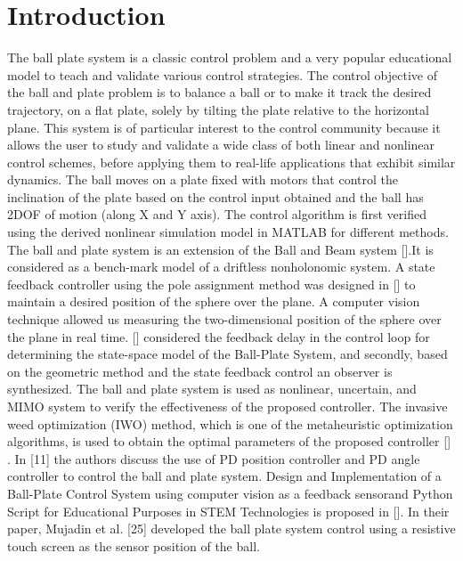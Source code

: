 \documentclass[conference]{IEEEtran}
\begin{document}
\section{Introduction}
The ball plate system is a classic control problem and a very popular educational model to teach and validate various control strategies. The control objective of the ball and plate problem is to balance a ball or to make it track the desired trajectory, on a flat plate, solely by tilting the plate relative to the horizontal plane. This system is of particular interest to the control community because it allows the user to study and validate a wide class of both linear and nonlinear control schemes, before applying them to real-life applications that exhibit similar dynamics. The ball moves on a plate fixed with motors that control the inclination of the plate based on the control input obtained and the ball has 2DOF of motion (along X and Y axis).   The control algorithm is first verified using the derived nonlinear simulation model in MATLAB for different methods.
The ball and plate system is an extension of the Ball and Beam system [].It is considered as a bench-mark model of a driftless nonholonomic system. A state feedback controller using the pole assignment method was designed in [] to maintain a desired position of the sphere over the plane. A computer vision technique allowed us measuring the two-dimensional position of the sphere over the plane in real time.  [] considered the feedback delay in the control loop for determining the state-space model of the Ball-Plate System, and secondly, based on the geometric method and the state feedback control an observer is synthesized. The ball and plate system is used as nonlinear, uncertain, and MIMO system to verify the effectiveness of the proposed controller.  The invasive weed optimization (IWO) method, which is one of the metaheuristic optimization algorithms, is used to obtain the optimal parameters of the proposed controller [] . In [11] the authors discuss the use of PD position controller and PD angle controller to control the ball and plate system. Design and Implementation of a Ball-Plate Control System using computer vision as a feedback sensorand Python Script for Educational Purposes in STEM Technologies is proposed in []. In their paper, Mujadin et al. [25] developed the ball plate system control using a resistive touch screen as the sensor position of the ball. 
\end{document}
